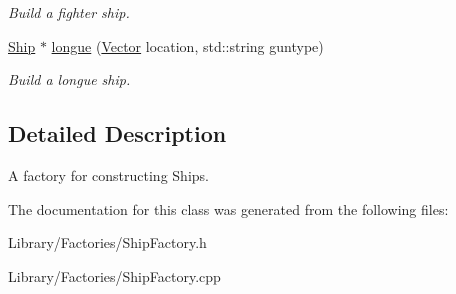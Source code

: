 \begin{DoxyCompactItemize}
\begin{DoxyCompactList}\small\item\em Build a fighter ship. \end{DoxyCompactList}\item 
\hypertarget{classty_lib_1_1_ship_factory_a5f19d60d3368cc4dc444df066f22cba1}{}\hyperlink{classty_lib_1_1_ship}{Ship} $\ast$ \hyperlink{classty_lib_1_1_ship_factory_a5f19d60d3368cc4dc444df066f22cba1}{longue} (\hyperlink{classty_lib_1_1_vector}{Vector} location, std\+::string guntype)\label{classty_lib_1_1_ship_factory_a5f19d60d3368cc4dc444df066f22cba1}

\begin{DoxyCompactList}\small\item\em Build a longue ship. \end{DoxyCompactList}\end{DoxyCompactItemize}


\subsection{Detailed Description}
A factory for constructing Ships. 

The documentation for this class was generated from the following files\+:\begin{DoxyCompactItemize}
\item 
Library/\+Factories/Ship\+Factory.\+h\item 
Library/\+Factories/Ship\+Factory.\+cpp\end{DoxyCompactItemize}
